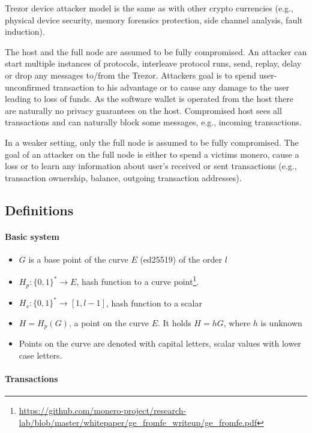 \documentclass[]{article}
\begin{document}
Trezor device attacker model is the same as with other crypto currencies (e.g., physical device security, memory forensics protection, side channel analysis, fault induction).

The host and the full node are assumed to be fully compromised. An attacker can start multiple instances of protocols, interleave protocol runs, send, replay, delay or drop any messages to/from the Trezor. Attackers goal is to spend user-unconfirmed transaction to his advantage or to cause any damage to the user leading to loss of funds. As the software wallet is operated from the host there are naturally no privacy guarantees on the host. Compromised host sees all transactions and can naturally block some messages, e.g., incoming transactions. 

In a weaker setting, only the full node is assumed to be fully compromised. The goal of an attacker on the full node is either to spend a victims monero, cause a loss or to learn any information about user's received or sent transactions (e.g., transaction ownership, balance, outgoing transaction addresses).
 
\subsection{Definitions}

\paragraph{Basic system}

\begin{itemize}
	\item $G$ is a base point of the curve $E$ (ed25519) of the order $l$
	\item $H_p : \{0,1\}^* \rightarrow E$, hash function to a curve point\footnote{\url{https://github.com/monero-project/research-lab/blob/master/whitepaper/ge_fromfe_writeup/ge_fromfe.pdf}}. 	
	\item $H_s : \{0,1\}^* \rightarrow [1, l-1]$, hash function to a scalar
	\item $H = H_p(G)$, a point on the curve $E$. It holds $H=hG$, where $h$ is unknown
	\item Points on the curve are denoted with capital letters, scalar values with lower case letters.
	
\end{itemize}

\paragraph{Transactions}
\end{document}

